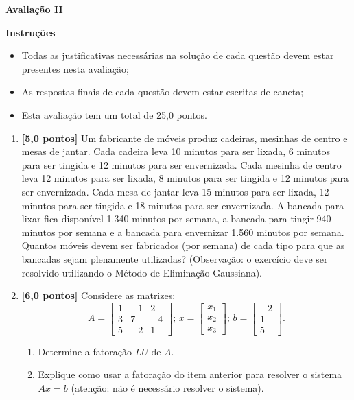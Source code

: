 \documentclass[12pt,a4paper]{article}
\begin{document}
\begin{center}
 \textbf{Avaliação II}
\end{center}

\textbf{Instruções}
\begin{itemize}
 \item Todas as justificativas necessárias na solução de cada questão devem estar presentes nesta avaliação;
 \item As respostas finais de cada questão devem estar escritas de caneta;
 \item Esta avaliação tem um total de 25,0 pontos.
\end{itemize}

\begin{enumerate}
 \item \textbf{[5,0 pontos]} Um fabricante de móveis produz cadeiras, mesinhas de centro e mesas
de jantar. Cada cadeira leva 10 minutos para ser lixada, 6 minutos
para ser tingida e 12 minutos para ser envernizada. Cada mesinha de
centro leva 12 minutos para ser lixada, 8 minutos para ser tingida
e 12 minutos para ser envernizada. Cada mesa de jantar leva 15 minutos
para ser lixada, 12 minutos para ser tingida e 18 minutos para ser
envernizada. A bancada para lixar fica disponível 1.340 minutos por
semana, a bancada para tingir 940 minutos por semana e a bancada para
envernizar 1.560 minutos por semana. Quantos móveis devem ser fabricados
(por semana) de cada tipo para que as bancadas sejam plenamente utilizadas? (Observação: o exercício deve ser resolvido 
utilizando o Método de Eliminação Gaussiana).

 \item \textbf{[6,0 pontos]} Considere as matrizes:
$$A=\begin{bmatrix}1 & - 1 & 2 \\ 3 & 7 & -4 \\ 5 & -2 & 1\end{bmatrix}; \, 
x=\begin{bmatrix}x_1 \\ x_2 \\ x_3\end{bmatrix}; \,
b=\begin{bmatrix}-2 \\ 1 \\ 5\end{bmatrix}. 
$$

  \begin{enumerate}
    \item Determine a fatoração $LU$ de $A$.
    \item Explique como usar a fatoração do item anterior para resolver o sistema $Ax = b$ (atenção: não é necessário resolver o sistema).
  \end{enumerate}


\end{enumerate}
\end{document}
